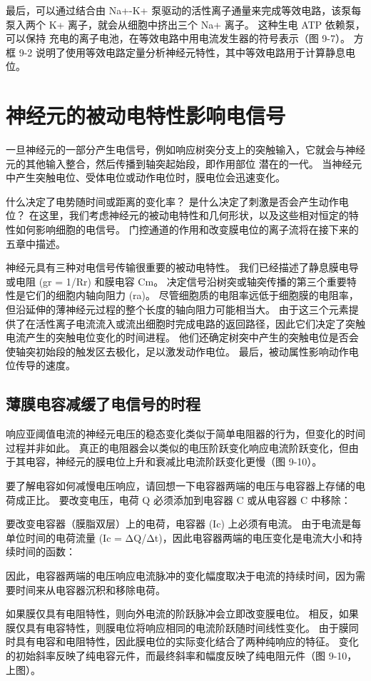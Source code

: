 最后，可以通过结合由 Na+-K+ 泵驱动的活性离子通量来完成等效电路，该泵每泵入两个 K+ 离子，就会从细胞中挤出三个 Na+ 离子。
这种生电 ATP 依赖泵，可以保持 充电的离子电池，在等效电路中用电流发生器的符号表示（图 9-7）。 
方框 9-2 说明了使用等效电路定量分析神经元特性，其中等效电路用于计算静息电位。


\section{神经元的被动电特性影响电信号}
一旦神经元的一部分产生电信号，例如响应树突分支上的突触输入，它就会与神经元的其他输入整合，然后传播到轴突起始段，即作用部位 潜在的一代。 
当神经元中产生突触电位、受体电位或动作电位时，膜电位会迅速变化。


什么决定了电势随时间或距离的变化率？ 
是什么决定了刺激是否会产生动作电位？ 
在这里，我们考虑神经元的被动电特性和几何形状，以及这些相对恒定的特性如何影响细胞的电信号。 
门控通道的作用和改变膜电位的离子流将在接下来的五章中描述。


神经元具有三种对电信号传输很重要的被动电特性。 
我们已经描述了静息膜电导或电阻 (gr = 1/Rr) 和膜电容 Cm。 
决定信号沿树突或轴突传播的第三个重要特性是它们的细胞内轴向阻力 (ra)。 
尽管细胞质的电阻率远低于细胞膜的电阻率，但沿延伸的薄神经元过程的整个长度的轴向阻力可能相当大。 
由于这三个元素提供了在活性离子电流流入或流出细胞时完成电路的返回路径，因此它们决定了突触电流产生的突触电位变化的时间进程。 
他们还确定树突中产生的突触电位是否会使轴突初始段的触发区去极化，足以激发动作电位。 
最后，被动属性影响动作电位传导的速度。


\subsection{薄膜电容减缓了电信号的时程}
响应亚阈值电流的神经元电压的稳态变化类似于简单电阻器的行为，但变化的时间过程并非如此。 
真正的电阻器会以类似的电压阶跃变化响应电流阶跃变化，但由于其电容，神经元的膜电位上升和衰减比电流阶跃变化更慢（图 9-10）。


要了解电容如何减慢电压响应，请回想一下电容器两端的电压与电容器上存储的电荷成正比。 
要改变电压，电荷 Q 必须添加到电容器 C 或从电容器 C 中移除：


要改变电容器（膜脂双层）上的电荷，电容器 (Ic) 上必须有电流。 
由于电流是每单位时间的电荷流量 (Ic = ΔQ/Δt)，因此电容器两端的电压变化是电流大小和持续时间的函数：


因此，电容器两端的电压响应电流脉冲的变化幅度取决于电流的持续时间，因为需要时间来从电容器沉积和移除电荷。


如果膜仅具有电阻特性，则向外电流的阶跃脉冲会立即改变膜电位。 
相反，如果膜仅具有电容特性，则膜电位将响应相同的电流阶跃随时间线性变化。 
由于膜同时具有电容和电阻特性，因此膜电位的实际变化结合了两种纯响应的特征。 
变化的初始斜率反映了纯电容元件，而最终斜率和幅度反映了纯电阻元件（图 9-10，上图）。


